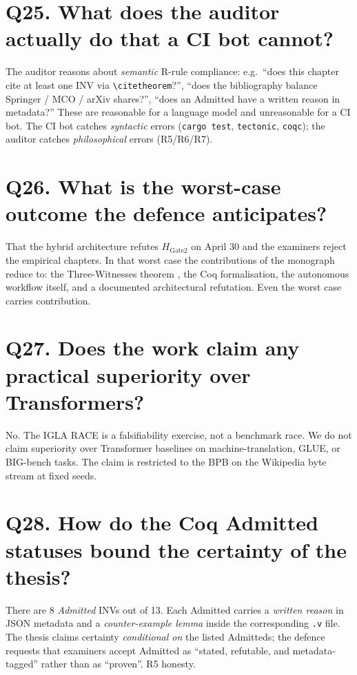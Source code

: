 \section*{Q25. What does the auditor actually do that a CI bot cannot?}
The auditor reasons about \emph{semantic} R-rule compliance: e.g.\ ``does
this chapter cite at least one INV via \texttt{\textbackslash citetheorem}?'',
``does the bibliography balance Springer / MCO / arXiv shares?'',
``does an Admitted have a written reason in metadata?'' These are
reasonable for a language model and unreasonable for a CI bot. The CI bot
catches \emph{syntactic} errors (\texttt{cargo test}, \texttt{tectonic},
\texttt{coqc}); the auditor catches \emph{philosophical} errors (R5/R6/R7).

\section*{Q26. What is the worst-case outcome the defence anticipates?}
That the hybrid architecture refutes $H_{\mathrm{Gate2}}$ on April 30 and
the examiners reject the empirical chapters. In that worst case the
contributions of the monograph reduce to: the Three-Witnesses theorem
\cite{lucas}, the Coq formalisation, the autonomous workflow itself, and a
documented architectural refutation. Even the worst case carries
contribution.

\section*{Q27. Does the work claim any practical superiority over Transformers?}
No. The IGLA RACE is a falsifiability exercise, not a benchmark race. We do
not claim superiority over Transformer baselines on machine-translation,
GLUE, or BIG-bench tasks. The claim is restricted to the BPB on the
Wikipedia byte stream at fixed seeds.

\section*{Q28. How do the Coq Admitted statuses bound the certainty of the thesis?}
There are 8 \emph{Admitted} INVs out of 13. Each Admitted carries a
\emph{written reason} in JSON metadata and a \emph{counter-example lemma}
inside the corresponding \texttt{.v} file. The thesis claims certainty
\emph{conditional on} the listed Admitteds; the defence requests that
examiners accept Admitted as ``stated, refutable, and metadata-tagged'' rather
than as ``proven''. R5 honesty.

